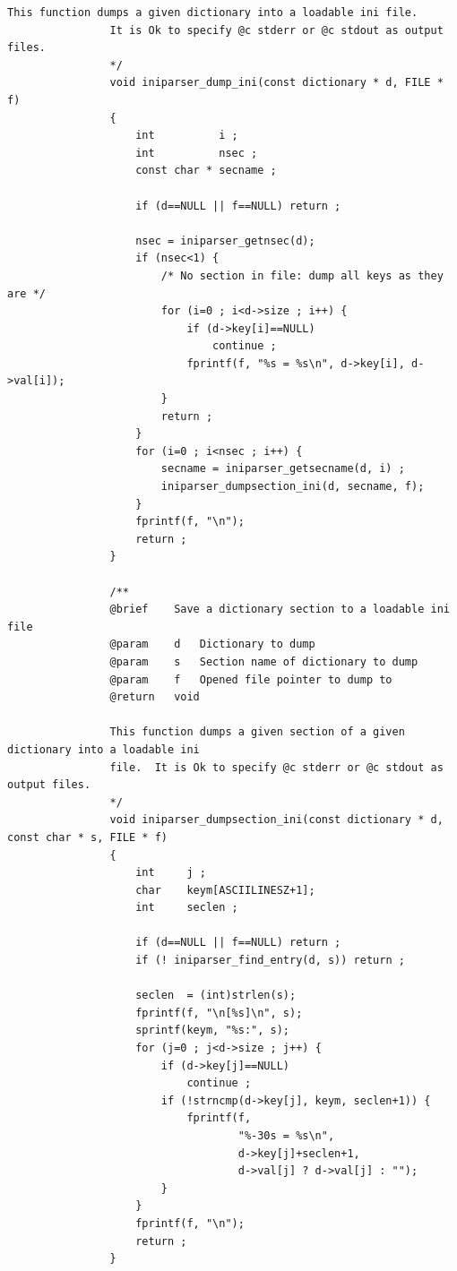 \documentclass{article}
\begin{document}
\begin{Verbatim}[gobble=8]
                This function dumps a given dictionary into a loadable ini file.
                It is Ok to specify @c stderr or @c stdout as output files.
                */
                void iniparser_dump_ini(const dictionary * d, FILE * f)
                {
                    int          i ;
                    int          nsec ;
                    const char * secname ;
                
                    if (d==NULL || f==NULL) return ;
                
                    nsec = iniparser_getnsec(d);
                    if (nsec<1) {
                        /* No section in file: dump all keys as they are */
                        for (i=0 ; i<d->size ; i++) {
                            if (d->key[i]==NULL)
                                continue ;
                            fprintf(f, "%s = %s\n", d->key[i], d->val[i]);
                        }
                        return ;
                    }
                    for (i=0 ; i<nsec ; i++) {
                        secname = iniparser_getsecname(d, i) ;
                        iniparser_dumpsection_ini(d, secname, f);
                    }
                    fprintf(f, "\n");
                    return ;
                }
                
                /**
                @brief    Save a dictionary section to a loadable ini file
                @param    d   Dictionary to dump
                @param    s   Section name of dictionary to dump
                @param    f   Opened file pointer to dump to
                @return   void
                
                This function dumps a given section of a given dictionary into a loadable ini
                file.  It is Ok to specify @c stderr or @c stdout as output files.
                */
                void iniparser_dumpsection_ini(const dictionary * d, const char * s, FILE * f)
                {
                    int     j ;
                    char    keym[ASCIILINESZ+1];
                    int     seclen ;
                
                    if (d==NULL || f==NULL) return ;
                    if (! iniparser_find_entry(d, s)) return ;
                
                    seclen  = (int)strlen(s);
                    fprintf(f, "\n[%s]\n", s);
                    sprintf(keym, "%s:", s);
                    for (j=0 ; j<d->size ; j++) {
                        if (d->key[j]==NULL)
                            continue ;
                        if (!strncmp(d->key[j], keym, seclen+1)) {
                            fprintf(f,
                                    "%-30s = %s\n",
                                    d->key[j]+seclen+1,
                                    d->val[j] ? d->val[j] : "");
                        }
                    }
                    fprintf(f, "\n");
                    return ;
                }
                

\end{Verbatim}
\end{document}
